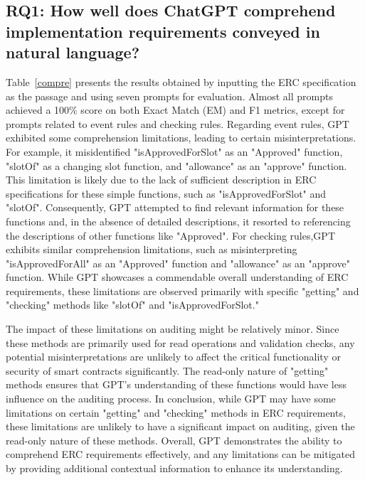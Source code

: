 \subsection{RQ1: How well does ChatGPT comprehend implementation requirements conveyed in natural language?}

Table~\ref{compre} presents the results obtained by inputting the ERC specification as the passage and using seven prompts for evaluation. 
Almost all prompts achieved a 100\% score on both Exact Match (EM) and F1 metrics, except for prompts related to event rules and checking rules. 
Regarding event rules, GPT exhibited some comprehension limitations, leading to certain misinterpretations. 
For example, it misidentified "isApprovedForSlot" as an "Approved" function, "slotOf" as a changing slot function, and "allowance" as an "approve" function. 
This limitation is likely due to the lack of sufficient description in ERC specifications for these simple functions, such as "isApprovedForSlot" and "slotOf". Consequently, 
GPT attempted to find relevant information for these functions and, in the absence of detailed descriptions, 
it resorted to referencing the descriptions of other functions like "Approved". 
For checking rules,GPT exhibits similar comprehension limitations, such as misinterpreting "isApprovedForAll" as an "Approved" function and "allowance" as an "approve" function. 
While GPT showcases a commendable overall understanding of ERC requirements, 
these limitations are observed primarily with specific "getting" and "checking" methods like "slotOf" and "isApprovedForSlot." 

The impact of these limitations on auditing might be relatively minor. 
Since these methods are primarily used for read operations and validation checks, 
any potential misinterpretations are unlikely to affect the critical functionality or security of smart contracts significantly. 
The read-only nature of "getting" methods ensures that GPT's understanding of these functions would have less influence on the auditing process.
In conclusion, while GPT may have some limitations on certain "getting" and "checking" methods in ERC requirements, 
these limitations are unlikely to have a significant impact on auditing, given the read-only nature of these methods. 
Overall, GPT demonstrates the ability to comprehend ERC requirements effectively, 
and any limitations can be mitigated by providing additional contextual information to enhance its understanding. 

